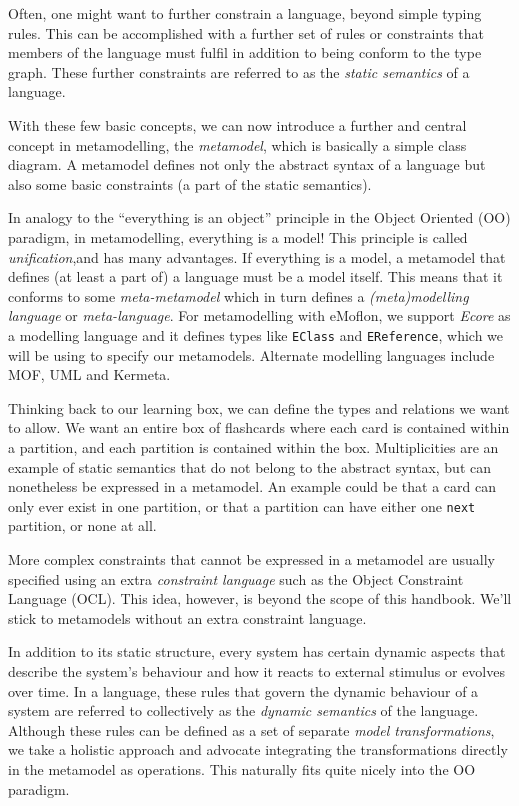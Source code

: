 Often, one might want to further constrain a language, beyond simple typing rules. This can be accomplished with a further set of rules or constraints that
members of the language must fulfil in addition to being conform to the type graph. These further constraints are referred to as the
\emph{static semantics} of a language.

With these few basic concepts, we can now introduce a further and central concept in metamodelling, the \emph{metamodel}, which is basically a
simple class diagram. A metamodel defines not only the abstract syntax of a language but also some basic constraints (a part of the static semantics).

In analogy to the ``everything is an object'' principle in the Object Oriented (OO) paradigm, in metamodelling, everything is a model! This
principle is called \emph{unification},and has many advantages. If everything is a model, a metamodel that
defines (at least a part of) a language must be a model itself. This means that it conforms to some
\emph{meta-metamodel} which in turn defines a \emph{(meta)modelling language} or \emph{meta-language}. For
metamodelling with eMoflon, we support \emph{Ecore} as a modelling language and it defines types like \texttt{EClass} and \texttt{EReference}, which we will be using to specify  our metamodels. Alternate modelling languages include MOF,
UML and Kermeta.

Thinking back to our learning box, we can define the types and relations we want to allow. We want an entire box of flashcards where each card is contained
within a partition, and each partition is contained within the box. Multiplicities are an example of static semantics that do not belong to the abstract
syntax, but can nonetheless be expressed in a metamodel. An example could be that a card can only ever exist in one partition, or that a partition can have
either one \texttt{next} partition, or none at all.

More complex constraints that cannot be expressed in a metamodel are usually specified using an extra \emph{constraint language}
such as the Object Constraint Language (OCL). This idea, however,  is beyond the scope of this handbook. We'll stick to metamodels without an extra
constraint language.

In addition to its static structure, every system has certain dynamic aspects that describe the system's behaviour and how it reacts to external stimulus or
evolves over time. In a language, these rules that govern the dynamic behaviour of a system are referred to collectively as the
\emph{dynamic semantics} of the language. Although these rules can be defined as a set of separate \emph{model transformations}, we
take a holistic approach and advocate integrating the transformations directly in the metamodel as operations. This naturally fits quite nicely into the OO
paradigm.

